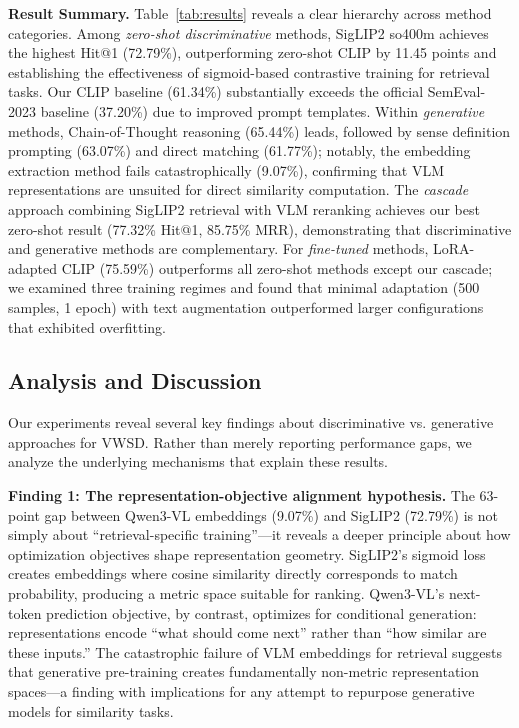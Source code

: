 \documentclass[11pt]{article}
\begin{document}
\textbf{Result Summary.} Table~\ref{tab:results} reveals a clear hierarchy across method categories. Among \textit{zero-shot discriminative} methods, SigLIP2 so400m achieves the highest Hit@1 (72.79\%), outperforming zero-shot CLIP by 11.45 points and establishing the effectiveness of sigmoid-based contrastive training for retrieval tasks. Our CLIP baseline (61.34\%) substantially exceeds the official SemEval-2023 baseline (37.20\%) due to improved prompt templates. Within \textit{generative} methods, Chain-of-Thought reasoning (65.44\%) leads, followed by sense definition prompting (63.07\%) and direct matching (61.77\%); notably, the embedding extraction method fails catastrophically (9.07\%), confirming that VLM representations are unsuited for direct similarity computation. The \textit{cascade} approach combining SigLIP2 retrieval with VLM reranking achieves our best zero-shot result (77.32\% Hit@1, 85.75\% MRR), demonstrating that discriminative and generative methods are complementary. For \textit{fine-tuned} methods, LoRA-adapted CLIP (75.59\%) outperforms all zero-shot methods except our cascade; we examined three training regimes and found that minimal adaptation (500 samples, 1 epoch) with text augmentation outperformed larger configurations that exhibited overfitting.

\subsection{Analysis and Discussion}

Our experiments reveal several key findings about discriminative vs. generative approaches for VWSD. Rather than merely reporting performance gaps, we analyze the underlying mechanisms that explain these results.

\textbf{Finding 1: The representation-objective alignment hypothesis.} The 63-point gap between Qwen3-VL embeddings (9.07\%) and SigLIP2 (72.79\%) is not simply about ``retrieval-specific training''---it reveals a deeper principle about how optimization objectives shape representation geometry. SigLIP2's sigmoid loss creates embeddings where cosine similarity directly corresponds to match probability, producing a metric space suitable for ranking. Qwen3-VL's next-token prediction objective, by contrast, optimizes for conditional generation: representations encode ``what should come next'' rather than ``how similar are these inputs.'' The catastrophic failure of VLM embeddings for retrieval suggests that generative pre-training creates fundamentally non-metric representation spaces---a finding with implications for any attempt to repurpose generative models for similarity tasks.
\end{document}
